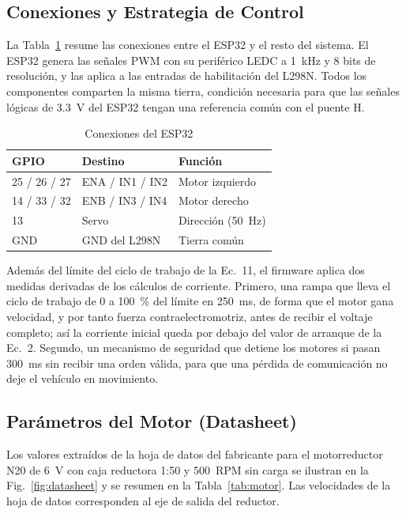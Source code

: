 \documentclass[conference]{IEEEtran}
\begin{document}
\subsection{Conexiones y Estrategia de Control}
La Tabla~\ref{tab:pines} resume las conexiones entre el ESP32 y el resto del sistema. El ESP32 genera las señales PWM con su periférico LEDC a \SI{1}{kHz} y 8 bits de resolución, y las aplica a las entradas de habilitación del L298N. Todos los componentes comparten la misma tierra, condición necesaria para que las señales lógicas de \SI{3.3}{V} del ESP32 tengan una referencia común con el puente H.

\begin{table}[!t]
\caption{Conexiones del ESP32}
\label{tab:pines}
\centering
\begin{tabular}{@{}lll@{}}
\toprule
GPIO & Destino & Función \\
\midrule
25 / 26 / 27 & ENA / IN1 / IN2 & Motor izquierdo \\
14 / 33 / 32 & ENB / IN3 / IN4 & Motor derecho \\
13 & Servo & Dirección (\SI{50}{Hz}) \\
GND & GND del L298N & Tierra común \\
\bottomrule
\end{tabular}
\end{table}

Además del límite del ciclo de trabajo de la Ec.~11, el firmware aplica dos medidas derivadas de los cálculos de corriente. Primero, una rampa que lleva el ciclo de trabajo de 0 a \SI{100}{\percent} del límite en \SI{250}{ms}, de forma que el motor gana velocidad, y por tanto fuerza contraelectromotriz, antes de recibir el voltaje completo; así la corriente inicial queda por debajo del valor de arranque de la Ec.~2. Segundo, un mecanismo de seguridad que detiene los motores si pasan \SI{300}{ms} sin recibir una orden válida, para que una pérdida de comunicación no deje el vehículo en movimiento.

\subsection{Parámetros del Motor (Datasheet)}
Los valores extraídos de la hoja de datos del fabricante \cite{foneacc} para el motorreductor N20 de \SI{6}{V} con caja reductora 1:50 y \SI{500}{RPM} sin carga se ilustran en la Fig.~\ref{fig:datasheet} y se resumen en la Tabla~\ref{tab:motor}. Las velocidades de la hoja de datos corresponden al eje de salida del reductor.
\end{document}
